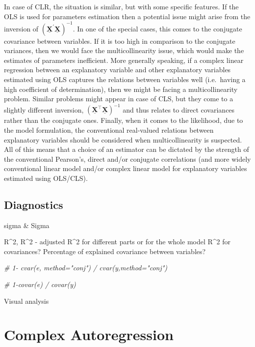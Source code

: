 \documentclass[
]{book}
\newenvironment{Shaded}{\begin{snugshade}}{\end{snugshade}}
\newcommand{\CommentTok}[1]{\textcolor[rgb]{0.56,0.35,0.01}{\textit{#1}}}
\begin{document}
In case of CLR, the situation is similar, but with some specific features. If the OLS is used for parameters estimation then a potential issue might arise from the inversion of \(\left( \underline{\mathbf{X}}^\prime \underline{\mathbf{X}}\right)^{-1}\). In one of the special cases, this comes to the conjugate covariance between variables. If it is too high in comparison to the conjugate variances, then we would face the multicollinearity issue, which would make the estimates of parameters inefficient. More generally speaking, if a complex linear regression between an explanatory variable and other explanatory variables estimated using OLS captures the relations between variables well (i.e.~having a high coefficient of determination), then we might be facing a multicollinearity problem. Similar problems might appear in case of CLS, but they come to a slightly different inversion, \(\left( \underline{\mathbf{X}}^\top \underline{\mathbf{X}}\right)^{-1}\) and thus relates to direct covariances rather than the conjugate ones. Finally, when it comes to the likelihood, due to the model formulation, the conventional real-valued relations between explanatory variables should be considered when multicollinearity is suspected. All of this means that a choice of an estimator can be dictated by the strength of the conventional Pearson's, direct and/or conjugate correlations (and more widely conventional linear model and/or complex linear model for explanatory variables estimated using OLS/CLS).

\hypertarget{diagnostics}{%
\section{Diagnostics}\label{diagnostics}}

sigma \& Sigma

R\^{}2, R\^{}2 - adjusted
R\^{}2 for different parts or for the whole model
R\^{}2 for covariances? Percentage of explained covariance between variables?

\begin{Shaded}
\begin{Highlighting}[]
\CommentTok{\# 1{-} cvar(e, method="conj") / cvar(y,method="conj")}

\CommentTok{\# 1{-}covar(e) / covar(y)}
\end{Highlighting}
\end{Shaded}

Visual analysis

\hypertarget{ComplexAR}{%
\chapter{Complex Autoregression}\label{ComplexAR}}
\end{document}
